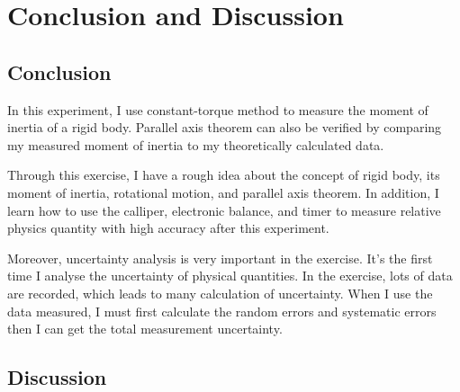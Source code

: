 \documentclass[12pt]{article}
\begin{document}
\section{Conclusion and Discussion}
\subsection{Conclusion}
In this experiment, I use constant-torque method to measure the moment of inertia of a rigid body. Parallel axis theorem can also be verified by comparing my measured moment of inertia to my theoretically calculated data.
\par Through this exercise, I have a rough idea about the concept of rigid body, its moment of inertia, rotational motion, and parallel axis theorem. In addition, I learn how to use the calliper, electronic balance, and timer to measure relative physics quantity with high accuracy after this experiment.  
\par Moreover, uncertainty analysis is very important in the exercise. It's the first time I analyse the uncertainty of physical quantities. In the exercise, lots of data are recorded, which leads to many calculation of uncertainty. When I use the data measured, I must first calculate the random errors and systematic errors then I can get the total measurement uncertainty.
\subsection{Discussion}
\end{document}
